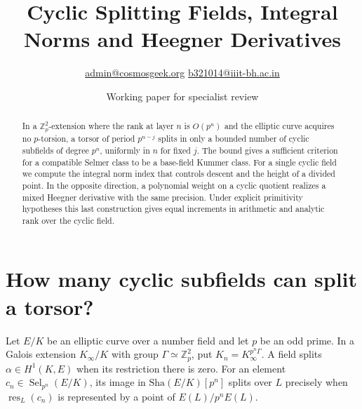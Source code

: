 \documentclass[11pt]{article}
\title{Cyclic Splitting Fields, Integral Norms and Heegner Derivatives}
\author{\small\href{mailto:admin@cosmosgeek.org}{admin@cosmosgeek.org}\qquad
\href{mailto:b321014@iiit-bh.ac.in}{b321014@iiit-bh.ac.in}}
\date{Working paper for specialist review}
\newcommand{\Z}{\mathbb Z}
\newcommand{\Sel}{\operatorname{Sel}}
\newcommand{\Sha}{\mathrm{Sha}}
\newcommand{\res}{\operatorname{res}}
\begin{document}
\maketitle
\begin{abstract}
In a $\Z_p^2$-extension where the rank at layer $n$ is $O(p^n)$
and the elliptic curve acquires no $p$-torsion, a torsor of period
$p^{n-j}$ splits in only a bounded number of cyclic subfields of degree
$p^n$, uniformly in $n$ for fixed $j$. The bound gives a sufficient
criterion for a compatible Selmer class to be a base-field Kummer class.
For a single cyclic field we compute the integral norm index that
controls descent and the height of a divided point. In the opposite
direction, a polynomial weight on a cyclic quotient realizes a mixed
Heegner derivative with the same precision. Under explicit primitivity
hypotheses this last construction gives equal increments in arithmetic
and analytic rank over the cyclic field.
\end{abstract}

\section{How many cyclic subfields can split a torsor?}
Let $E/K$ be an elliptic curve over a number field and let $p$ be an odd
prime. In a Galois extension $K_\infty/K$ with group
$\Gamma\simeq\Z_p^2$, put $K_n=K_\infty^{p^n\Gamma}$.
A field splits $\alpha\in H^1(K,E)$ when its restriction there
is zero. For an element $c_n\in\Sel_{p^n}(E/K)$, its image in
$\Sha(E/K)[p^n]$ splits over $L$ precisely when
$\res_L(c_n)$ is represented by a point of $E(L)/p^nE(L)$.
\end{document}
